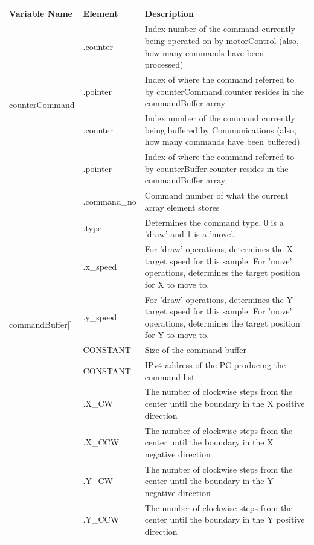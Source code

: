 	
		\begin{center}
			\begin{tabular}{|l|l|p{10cm}|}
				\hline
				Variable Name & Element & Description\\ \hline
				\multirow{4}{*}{counterCommand} & .counter & Index number of the command currently being operated on by motorControl (also, how many commands have been processed)\\ \cline{2-3}
					 & .pointer & Index of where the command referred to by counterCommand.counter resides in the commandBuffer array\\ \hline
				\multirow{4}{*}{counterBuffer} & .counter & Index number of the command currently being buffered by Communications (also, how many commands have been buffered)\\ \cline{2-3}
					 & .pointer & Index of where the command referred to by counterBuffer.counter resides in the commandBuffer array\\ \hline
				\multirow{8}{*}{commandBuffer[]} & .command\_no & Command number of what the current array element stores\\ \cline{2-3}
					& .type & Determines the command type. 0 is a 'draw' and 1 is a 'move'. \\ \cline{2-3}
					& .x\_speed & For 'draw' operations, determines the X target speed for this sample. For 'move' operations, determines the target position for X to move to. \\ \cline{2-3}
					& .y\_speed & For 'draw' operations, determines the Y target speed for this sample. For 'move' operations, determines the target position for Y to move to. \\ \hline
				BUFFER\_SIZE & CONSTANT & Size of the command buffer \\ \hline
				PC\_IP & CONSTANT & IPv4 address of the PC producing the command list \\ \hline
				\multirow{8}{*}{boundaries} & .X\_CW & The number of clockwise steps from the center until the boundary in the X positive direction\\ \cline{2-3}
					 & .X\_CCW & The number of clockwise steps from the center until the boundary in the X negative direction\\\cline{2-3}
					 & .Y\_CW & The number of clockwise steps from the center until the boundary in the Y negative direction\\ \cline{2-3}
					 & .Y\_CCW & The number of clockwise steps from the center until the boundary in the Y positive direction\\ \hline

\end{tabular}
\end{center}
